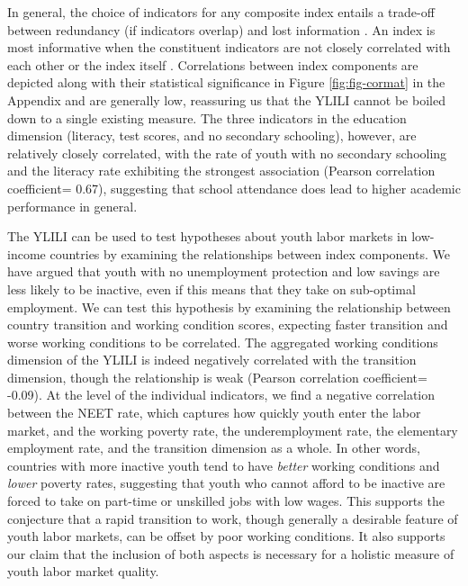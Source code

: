 \documentclass[
  a4paper, twoside, 12pt]{book}
\begin{document}
In general, the choice of indicators for any composite index entails a trade-off between redundancy (if indicators overlap) and lost information \autocite{oecd2008}. An index is most informative when the constituent indicators are not closely correlated with each other or the index itself \autocite{noorbakhsh1998}. Correlations between index components are depicted along with their statistical significance in Figure \ref{fig:fig-cormat} in the Appendix and are generally low, reassuring us that the YLILI cannot be boiled down to a single existing measure. The three indicators in the education dimension (literacy, test scores, and no secondary schooling), however, are relatively closely correlated, with the rate of youth with no secondary schooling and the literacy rate exhibiting the strongest association (Pearson correlation coefficient= 0.67), suggesting that school attendance does lead to higher academic performance in general.

The YLILI can be used to test hypotheses about youth labor markets in low-income countries by examining the relationships between index components. We have argued that youth with no unemployment protection and low savings are less likely to be inactive, even if this means that they take on sub-optimal employment. We can test this hypothesis by examining the relationship between country transition and working condition scores, expecting faster transition and worse working conditions to be correlated. The aggregated working conditions dimension of the YLILI is indeed negatively correlated with the transition dimension, though the relationship is weak (Pearson correlation coefficient= -0.09). At the level of the individual indicators, we find a negative correlation between the NEET rate, which captures how quickly youth enter the labor market, and the working poverty rate, the underemployment rate, the elementary employment rate, and the transition dimension as a whole. In other words, countries with more inactive youth tend to have \emph{better} working conditions and \emph{lower} poverty rates, suggesting that youth who cannot afford to be inactive are forced to take on part-time or unskilled jobs with low wages. This supports the conjecture that a rapid transition to work, though generally a desirable feature of youth labor markets, can be offset by poor working conditions. It also supports our claim that the inclusion of both aspects is necessary for a holistic measure of youth labor market quality.
\end{document}
